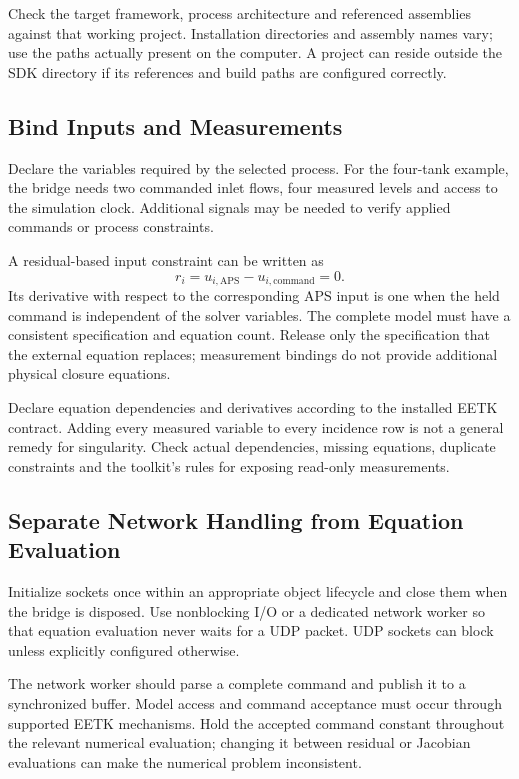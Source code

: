 \documentclass[11pt, letterpaper]{article}
\begin{document}
Check the target framework, process architecture and referenced assemblies against that working project. Installation directories and assembly names vary; use the paths actually present on the computer. A project can reside outside the SDK directory if its references and build paths are configured correctly.

\subsection{Bind Inputs and Measurements}
Declare the variables required by the selected process. For the four-tank example, the bridge needs two commanded inlet flows, four measured levels and access to the simulation clock. Additional signals may be needed to verify applied commands or process constraints.

A residual-based input constraint can be written as
\begin{equation}
r_i = u_{i,\mathrm{APS}} - u_{i,\mathrm{command}} = 0.
\end{equation}
Its derivative with respect to the corresponding APS input is one when the held command is independent of the solver variables. The complete model must have a consistent specification and equation count. Release only the specification that the external equation replaces; measurement bindings do not provide additional physical closure equations.

\begin{notebox}
Declare equation dependencies and derivatives according to the installed EETK contract. Adding every measured variable to every incidence row is not a general remedy for singularity. Check actual dependencies, missing equations, duplicate constraints and the toolkit's rules for exposing read-only measurements.
\end{notebox}

\subsection{Separate Network Handling from Equation Evaluation}
Initialize sockets once within an appropriate object lifecycle and close them when the bridge is disposed. Use nonblocking I/O or a dedicated network worker so that equation evaluation never waits for a UDP packet. UDP sockets can block unless explicitly configured otherwise.

The network worker should parse a complete command and publish it to a synchronized buffer. Model access and command acceptance must occur through supported EETK mechanisms. Hold the accepted command constant throughout the relevant numerical evaluation; changing it between residual or Jacobian evaluations can make the numerical problem inconsistent.
\end{document}
